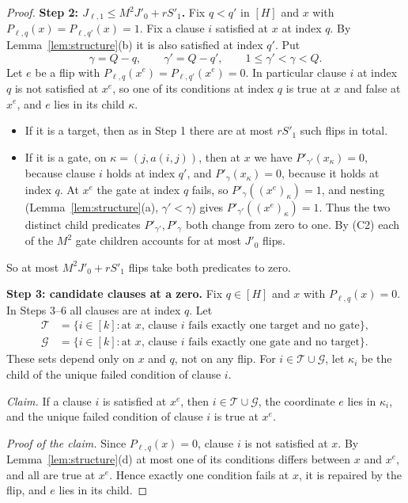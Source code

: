 \documentclass[11pt]{article}
\theoremstyle{definition}
\theoremstyle{remark}
\begin{document}
\begin{proof}
\medskip\noindent\textbf{Step 2: \(J_{\ell,1}\le M^2J'_0+rS'_1\).}
Fix \(q<q'\) in \([H]\) and \(x\) with
\(P_{\ell,q}(x)=P_{\ell,q'}(x)=1\). Fix a clause \(i\) satisfied at \(x\) at
index \(q\). By Lemma~\ref{lem:structure}(b) it is also satisfied at index
\(q'\). Put
\[
 \gamma=Q-q,\qquad \gamma'=Q-q',\qquad 1\leq \gamma'<\gamma<Q.
\]
Let \(e\) be a flip with \(P_{\ell,q}(x^e)=P_{\ell,q'}(x^e)=0\). In particular
clause \(i\) at index \(q\) is not satisfied at \(x^e\), so one of its
conditions at index \(q\) is true at \(x\) and false at \(x^e\), and \(e\)
lies in its child \(\kappa\).
\begin{itemize}[leftmargin=2em]
\item If it is a target, then as in Step 1 there are at most \(rS'_1\) such
flips in total.
\item If it is a gate, on \(\kappa=(j,a(i,j))\), then at \(x\) we have
\(P'_{\gamma'}(x_\kappa)=0\), because clause \(i\) holds at index \(q'\), and
\(P'_{\gamma}(x_\kappa)=0\), because it holds at index \(q\). At \(x^e\) the
gate at index \(q\) fails, so \(P'_\gamma((x^e)_\kappa)=1\), and nesting
(Lemma~\ref{lem:structure}(a), \(\gamma'<\gamma\)) gives
\(P'_{\gamma'}((x^e)_\kappa)=1\). Thus the two distinct child predicates
\(P'_{\gamma'},P'_\gamma\) both change from zero to one. By (C2) each of the
\(M^2\) gate children accounts for at most \(J'_0\) flips.
\end{itemize}
So at most \(M^2J'_0+rS'_1\) flips take both predicates to zero.

\medskip\noindent\textbf{Step 3: candidate clauses at a zero.}
Fix \(q\in[H]\) and \(x\) with \(P_{\ell,q}(x)=0\). In Steps 3--6 all clauses
are at index \(q\). Let
\begin{align*}
\mathcal T&=\{i\in[k]:\text{at }x\text{, clause }i\text{ fails exactly one target and no gate}\},\\
\mathcal G&=\{i\in[k]:\text{at }x\text{, clause }i\text{ fails exactly one gate and no target}\}.
\end{align*}
These sets depend only on \(x\) and \(q\), not on any flip. For
\(i\in\mathcal T\cup\mathcal G\), let \(\kappa_i\) be the child of the unique
failed condition of clause \(i\).

\emph{Claim.} If a clause \(i\) is satisfied at \(x^e\), then
\(i\in\mathcal T\cup\mathcal G\), the coordinate \(e\) lies in \(\kappa_i\),
and the unique failed condition of clause \(i\) is true at \(x^e\).

\emph{Proof of the claim.} Since \(P_{\ell,q}(x)=0\), clause \(i\) is not
satisfied at \(x\). By Lemma~\ref{lem:structure}(d) at most one of its
conditions differs between \(x\) and \(x^e\), and all are true at \(x^e\).
Hence exactly one condition fails at \(x\), it is repaired by the flip, and
\(e\) lies in its child.


\end{proof}
\end{document}
